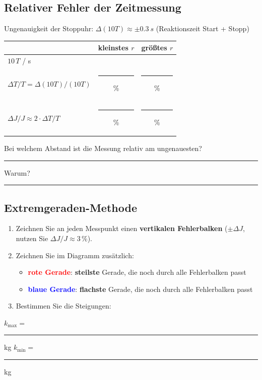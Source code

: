\documentclass[11pt,a4paper]{scrartcl}
\begin{document}
\subsection*{Relativer Fehler der Zeitmessung}

Ungenauigkeit der Stoppuhr: $\Delta(10T) \approx \pm\SI{0,3}{s}$ (Reaktionszeit Start + Stopp)

\begin{center}
	\renewcommand{\arraystretch}{2.2}
	\begin{tabular}{|l|c|c|}
		\hline
		& \textbf{kleinstes $r$} & \textbf{größtes $r$} \\
		\hline
		$10\,T$ / s & & \\
		\hline
		$\Delta T / T = \Delta(10T) / (10T)$ & \rule{2cm}{0.4pt} \% & \rule{2cm}{0.4pt} \% \\
		\hline
		$\Delta J / J \approx 2 \cdot \Delta T / T$ & \rule{2cm}{0.4pt} \% & \rule{2cm}{0.4pt} \% \\
		\hline
	\end{tabular}
\end{center}

Bei welchem Abstand ist die Messung relativ am ungenauesten? \rule{8cm}{0.4pt}

Warum? \rule{10cm}{0.4pt}

\subsection*{Extremgeraden-Methode}

\begin{enumerate}
	\item Zeichnen Sie an jeden Messpunkt einen \textbf{vertikalen Fehlerbalken} ($\pm\Delta J$, nutzen Sie $\Delta J / J \approx 3\,\%$).
	\item Zeichnen Sie im Diagramm zusätzlich:
	\begin{itemize}
		\item \textcolor{red}{\textbf{rote Gerade}}: \textbf{steilste} Gerade, die noch durch alle Fehlerbalken passt
		\item \textcolor{blue}{\textbf{blaue Gerade}}: \textbf{flachste} Gerade, die noch durch alle Fehlerbalken passt
	\end{itemize}
	\item Bestimmen Sie die Steigungen:
\end{enumerate}

\vspace{0.3cm}
$k_\text{max} = $ \rule{3cm}{0.4pt} kg \qquad $k_\text{min} = $ \rule{3cm}{0.4pt} kg
\end{document}
